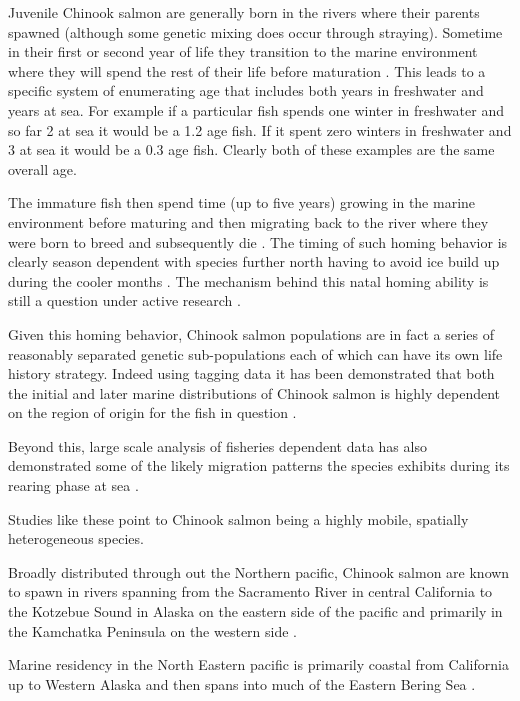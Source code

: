\documentclass[11pt]{article}
\begin{document}
Juvenile Chinook salmon are generally born in the rivers where their parents spawned (although some genetic mixing does occur through straying). Sometime in their first or second year of life they transition to the marine environment where they will spend the rest of their life before maturation \citep{oceanchinook}. This leads to a specific system of enumerating age that includes both years in freshwater and years at sea. For example if a particular fish spends one winter in freshwater and so far 2 at sea it would be a 1.2 age fish. If it spent zero winters in freshwater and 3 at sea it would be a 0.3 age fish. Clearly both of these examples are the same overall age.

The immature fish then spend time (up to five years) growing in the marine environment before maturing and then migrating back to the river where they were born to breed and subsequently die \citep{oceanchinook}. The timing of such homing behavior is clearly season dependent with species further north having to avoid ice build up during the cooler months \citep{oceanchinook}. The mechanism behind this natal homing ability is still a question under active research \citep{bracis2012}. \newline

Given this homing behavior, Chinook salmon populations are in fact a series of reasonably separated genetic sub-populations each of which can have its own life history strategy. Indeed using tagging data it has been demonstrated that both the initial and later marine distributions of Chinook salmon is highly dependent on the region of origin for the fish in question \citep{shelton2019} \citep{tucker2019}. 

Beyond this, large scale analysis of fisheries dependent data has also demonstrated some of the likely migration patterns the species exhibits during its rearing phase at sea \citep{langan2024}. 

Studies like these point to Chinook salmon being a highly mobile, spatially heterogeneous species.\newline

Broadly distributed through out the Northern pacific, Chinook salmon are known to spawn in rivers spanning from the Sacramento River in central California to the Kotzebue Sound in Alaska on the eastern side of the pacific and primarily in the Kamchatka Peninsula on the western side \citep{oceanchinook}. 

Marine residency in the North Eastern pacific is primarily coastal from California up to Western Alaska and then spans into much of the Eastern Bering Sea \citep{oceanchinook} \citep{langan2024}. \newline
\end{document}
